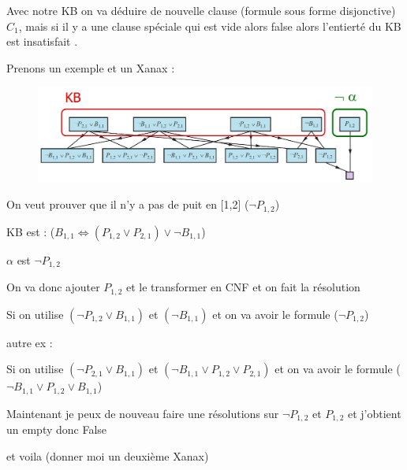				Avec notre KB on va déduire de nouvelle clause (formule sous forme disjonctive)$C_1$, mais si il y a une clause spéciale qui est vide alors false alors l'entierté du KB est insatisfait .
				
				
				Prenons un exemple et un Xanax :
				
				\begin{figure}[H]
					\centering
					\includegraphics[width=\textwidth]{img/proof2.png}
				\end{figure}
				
				On veut prouver que il n'y a pas de puit en [1,2] ($\neg P_{1,2}$)
				
				KB est : ($B_{1,1} \Leftrightarrow (P_{1,2} \lor P_{2,1}) \lor\neg B_{1,1}$)
				
				$\alpha$ est $\neg P_{1,2}$
				
				On va donc ajouter $P_{1,2}$ et le transformer en CNF et on fait la résolution
				
				Si on utilise $(\neg P_{1,2} \lor B_{1,1})$ et $(\neg B_{1,1})$ et on va avoir le formule ($\neg P_{1,2}$)
				
				autre ex :
				
				Si on utilise $(\neg P_{2,1} \lor B_{1,1})$ et $(\neg B_{1,1} \lor P_{1,2} \lor P_{2,1})$ et on va avoir le formule ($\neg B_{1,1} \lor P_{1,2} \lor B_{1,1}$)
				
				Maintenant je peux de nouveau faire une résolutions sur $\neg P_{1,2}$ et $P_{1,2}$ et j'obtient un empty donc False
				
				et voila (donner moi un deuxième Xanax)
				
				
			
		
		